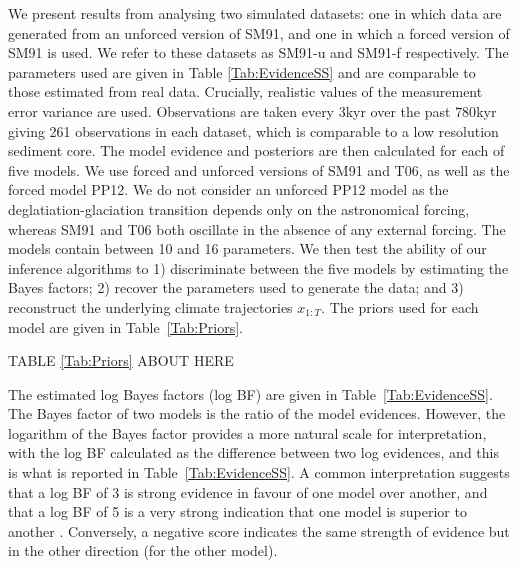 \documentclass[a4paper,12pt]{article}
\begin{document}
We present results from analysing two simulated datasets: one in which data are generated from an unforced version of SM91, and one in which a forced version of SM91 is used. 
We refer to these datasets as SM91-u and SM91-f respectively. The parameters used are given in Table \ref{Tab:EvidenceSS} and are comparable to those estimated from real data. Crucially, realistic values of the measurement error variance are used. 
Observations are taken every $3$kyr over the past $780$kyr giving 261 observations in each dataset, which  is comparable to a  low resolution sediment core.
The model evidence and posteriors are then calculated for  each of five models. We use  forced and unforced versions of SM91 and T06, as well as the forced model PP12. We do not consider an unforced PP12 model as the deglatiation-glaciation transition depends only on the astronomical forcing, whereas SM91 and T06 both oscillate in the absence of any external forcing. The models contain between 10 and 16 parameters. We then test the ability of  our inference algorithms to 1) discriminate between the five models by  estimating  the Bayes factors; 2) recover the parameters used to generate the data; and 3) reconstruct the underlying climate trajectories $x_{1:T}$.
The priors used for each model are given in Table~\ref{Tab:Priors}.


\begin{center}
\begin{LARGE}
TABLE \ref{Tab:Priors} ABOUT HERE
\end{LARGE}
\end{center}



The estimated log Bayes factors (log BF) 
 are given in Table~\ref{Tab:EvidenceSS}. 
The  Bayes factor of two models is the ratio of the model evidences. However, the logarithm of the Bayes factor provides a more natural scale for interpretation, with the log BF calculated as the difference between two log evidences, and this is what is reported in Table~\ref{Tab:EvidenceSS}.
A common interpretation suggests that a log BF of 3 is strong evidence in favour  of one model over another, and that a log BF of 5 is a very strong indication that one model is superior to another \cite{Kass1995}. Conversely, a negative score indicates the same strength of evidence but in the other direction (for the other model).
\end{document}
